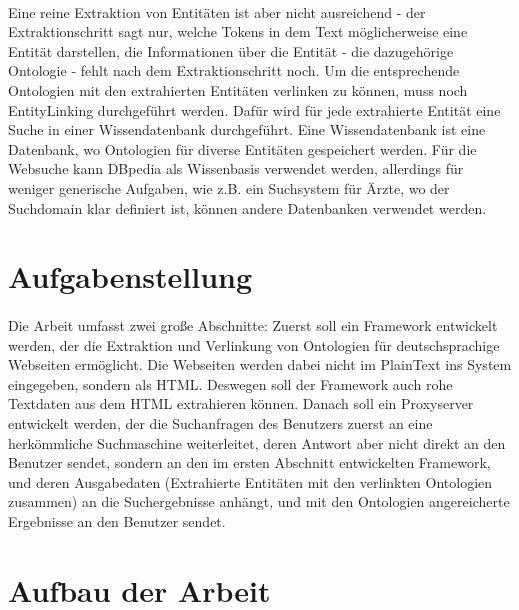 \paragraph{}
Eine reine Extraktion von Entitäten ist aber nicht ausreichend - der Extraktionschritt sagt nur, welche Tokens in dem Text möglicherweise eine Entität darstellen, die Informationen über die Entität - die dazugehörige Ontologie - fehlt nach dem Extraktionschritt noch. Um die entsprechende Ontologien mit den extrahierten Entitäten verlinken zu können, muss noch EntityLinking durchgeführt werden. Dafür wird für jede extrahierte Entität eine Suche in einer Wissendatenbank durchgeführt. Eine Wissendatenbank ist eine Datenbank, wo Ontologien für diverse Entitäten gespeichert werden. Für die Websuche kann DBpedia als Wissenbasis verwendet werden, allerdings für weniger generische Aufgaben, wie z.B. ein Suchsystem für Ärzte, wo der Suchdomain klar definiert ist, können andere Datenbanken verwendet werden.

\section{Aufgabenstellung}
\label{sec:Aufgabenstellung}
\paragraph{}
Die Arbeit umfasst zwei große Abschnitte: Zuerst soll ein Framework entwickelt werden, der die Extraktion und Verlinkung von Ontologien für deutschsprachige Webseiten ermöglicht. Die Webseiten werden dabei nicht im PlainText ins System eingegeben, sondern als HTML. Deswegen soll der Framework auch rohe Textdaten aus dem HTML extrahieren können. Danach soll ein Proxyserver  entwickelt werden, der die Suchanfragen des Benutzers zuerst an eine herkömmliche Suchmaschine weiterleitet, deren Antwort aber nicht direkt an den Benutzer sendet, sondern an den im ersten Abschnitt entwickelten Framework, und deren Ausgabedaten (Extrahierte Entitäten mit den verlinkten Ontologien zusammen) an die Suchergebnisse anhängt, und mit den Ontologien angereicherte Ergebnisse an den Benutzer sendet.

\paragraph{}


\section{Aufbau der Arbeit}
\label{sec:Aufbau der Arbeit}